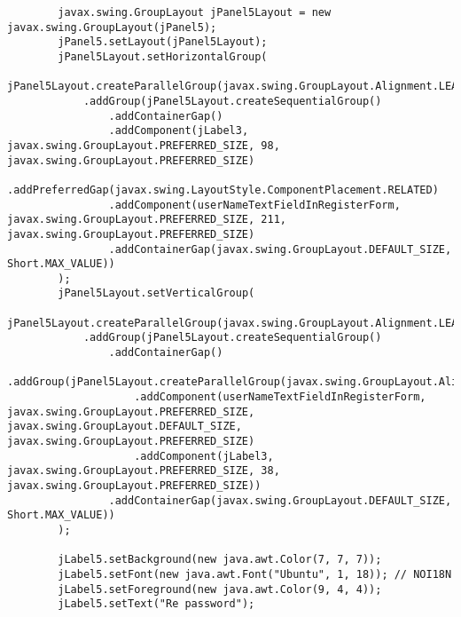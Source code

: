 \documentclass[12pt,a4paper]{article}
\begin{document}
\begin{lstlisting}
        javax.swing.GroupLayout jPanel5Layout = new javax.swing.GroupLayout(jPanel5);
        jPanel5.setLayout(jPanel5Layout);
        jPanel5Layout.setHorizontalGroup(
            jPanel5Layout.createParallelGroup(javax.swing.GroupLayout.Alignment.LEADING)
            .addGroup(jPanel5Layout.createSequentialGroup()
                .addContainerGap()
                .addComponent(jLabel3, javax.swing.GroupLayout.PREFERRED_SIZE, 98, javax.swing.GroupLayout.PREFERRED_SIZE)
                .addPreferredGap(javax.swing.LayoutStyle.ComponentPlacement.RELATED)
                .addComponent(userNameTextFieldInRegisterForm, javax.swing.GroupLayout.PREFERRED_SIZE, 211, javax.swing.GroupLayout.PREFERRED_SIZE)
                .addContainerGap(javax.swing.GroupLayout.DEFAULT_SIZE, Short.MAX_VALUE))
        );
        jPanel5Layout.setVerticalGroup(
            jPanel5Layout.createParallelGroup(javax.swing.GroupLayout.Alignment.LEADING)
            .addGroup(jPanel5Layout.createSequentialGroup()
                .addContainerGap()
                .addGroup(jPanel5Layout.createParallelGroup(javax.swing.GroupLayout.Alignment.LEADING)
                    .addComponent(userNameTextFieldInRegisterForm, javax.swing.GroupLayout.PREFERRED_SIZE, javax.swing.GroupLayout.DEFAULT_SIZE, javax.swing.GroupLayout.PREFERRED_SIZE)
                    .addComponent(jLabel3, javax.swing.GroupLayout.PREFERRED_SIZE, 38, javax.swing.GroupLayout.PREFERRED_SIZE))
                .addContainerGap(javax.swing.GroupLayout.DEFAULT_SIZE, Short.MAX_VALUE))
        );

        jLabel5.setBackground(new java.awt.Color(7, 7, 7));
        jLabel5.setFont(new java.awt.Font("Ubuntu", 1, 18)); // NOI18N
        jLabel5.setForeground(new java.awt.Color(9, 4, 4));
        jLabel5.setText("Re password");


\end{lstlisting}
\end{document}
